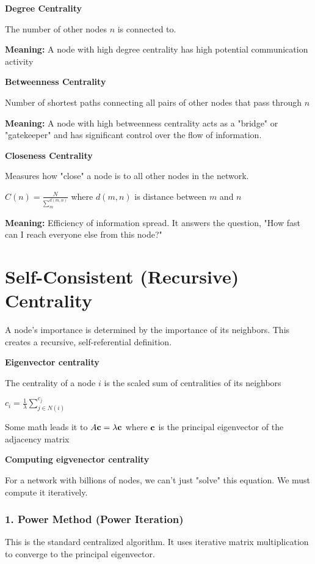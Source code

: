 \textbf{Degree Centrality}

The number of other nodes $n$ is connected to. 

\textbf{Meaning:} A node with high degree centrality 
has high potential communication activity

\textbf{Betweenness Centrality}

Number of shortest paths connecting all pairs of other nodes that pass through $n$

\textbf{Meaning:} A node with high betweenness centrality acts as a "bridge" or "gatekeeper"
and has significant control over the flow of information.

\textbf{Closeness Centrality}

Measures how "close" a node is to all other nodes in the network.

$
C(n) = \frac{N}{\sum_{m}^{d(m, n)}}
$
where $d(m, n)$ is distance between $m$ and $n$

\textbf{Meaning:} Efficiency of information spread. It answers the question,
"How fast can I reach everyone else from this node?"

\section*{Self-Consistent (Recursive) Centrality}

A node's importance is determined by the importance of its neighbors. 
This creates a recursive, self-referential definition.

\textbf{Eigenvector centrality}

The centrality of a node $i$ is the scaled sum of centralities of its neighbors

$
c_i = \frac{1}{\lambda} \sum_{j \in N(i)}^{c_j}
$

Some math leads it to $A \mathbf{c} = \lambda \mathbf{c}$ where $\mathbf{c}$ is the principal 
eigenvector of the adjacency matrix

\textbf{Computing eigvenector centrality}

For a network with billions of nodes, we can't just "solve" this equation. We must compute it iteratively.


\subsubsection*{1. Power Method (Power Iteration)}
This is the standard centralized algorithm. It uses iterative matrix multiplication to converge to the principal eigenvector.

